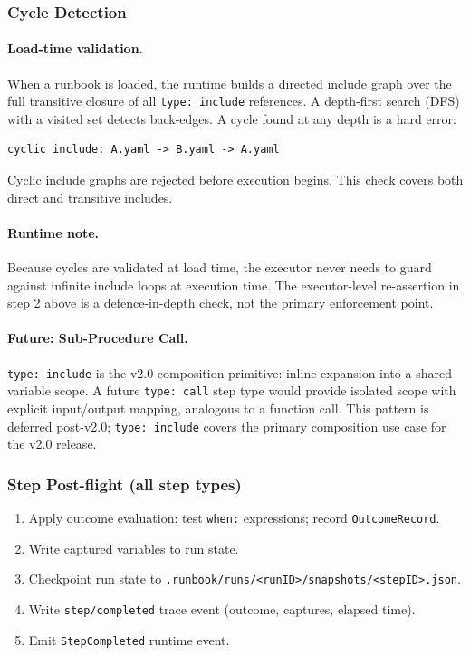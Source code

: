 \subsubsection*{Cycle Detection}
\label{sec:include_cycle_detection}

\paragraph{Load-time validation.}
When a runbook is loaded, the runtime builds a directed include graph over the full
transitive closure of all \texttt{type: include} references. A depth-first search (DFS)
with a visited set detects back-edges. A cycle found at any depth is a hard error:

\begin{verbatim}
cyclic include: A.yaml -> B.yaml -> A.yaml
\end{verbatim}

Cyclic include graphs are rejected before execution begins. This check covers both direct
and transitive includes.

\paragraph{Runtime note.}
Because cycles are validated at load time, the executor never needs to guard against
infinite include loops at execution time. The executor-level re-assertion in step 2 above
is a defence-in-depth check, not the primary enforcement point.

\paragraph{Future: Sub-Procedure Call.}
\texttt{type: include} is the v2.0 composition primitive: inline expansion into a shared
variable scope. A future \texttt{type: call} step type would provide isolated scope with
explicit input/output mapping, analogous to a function call. This pattern is deferred
post-v2.0; \texttt{type: include} covers the primary composition use case for the v2.0
release.

\subsubsection*{Step Post-flight (all step types)}
\begin{enumerate}
  \item Apply outcome evaluation: test \texttt{when:} expressions; record \texttt{OutcomeRecord}.
  \item Write captured variables to run state.
  \item Checkpoint run state to \texttt{.runbook/runs/<runID>/snapshots/<stepID>.json}.
  \item Write \texttt{step/completed} trace event (outcome, captures, elapsed time).
  \item Emit \texttt{StepCompleted} runtime event.
\end{enumerate}

